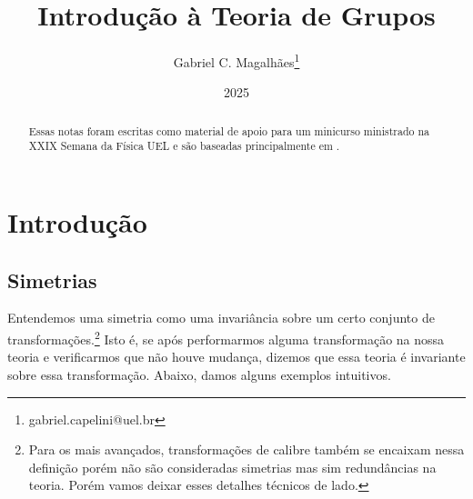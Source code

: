 \documentclass{article}
\title{Introdução à Teoria de Grupos}
\author{Gabriel C. Magalhães\footnote{gabriel.capelini@uel.br}}
\date{2025}
\numberwithin{equation}{section}
\numberwithin{figure}{section}
\begin{document}
\maketitle

\begin{abstract}
Essas notas foram escritas como material de apoio para um minicurso ministrado na XXIX Semana da Física UEL e são baseadas principalmente em \cite{jakob}. 
\end{abstract}

\tableofcontents
\pagebreak

\section{Introdução}
\subsection{Simetrias}
Entendemos uma simetria como uma invariância sobre um certo conjunto de transformações.\footnote{Para os mais avançados, transformações de calibre também se encaixam nessa definição porém não são consideradas simetrias mas sim redundâncias na teoria. Porém vamos deixar esses detalhes técnicos de lado.} Isto é, se após performarmos alguma transformação na nossa teoria e verificarmos que não houve mudança, dizemos que essa teoria é invariante sobre essa transformação. Abaixo, damos alguns exemplos intuitivos. 
\end{document}
